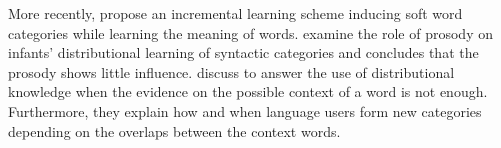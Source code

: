 More recently, \cite{alishahi2012concurrent} propose an incremental learning
scheme inducing soft word categories while learning the meaning of words. 
\cite{thothathiri2012effect} examine the role of prosody on infants' distributional learning of
syntactic categories and concludes that the prosody shows little influence. \cite{reeder2013shared} discuss to answer the use of distributional knowledge when the evidence on  the possible context of a word is not enough. Furthermore,
they explain how and when language users form new categories depending on
the overlaps between the context words.
